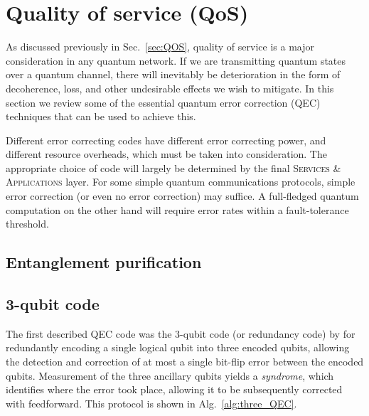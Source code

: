 %
%

\section{Quality of service (QoS)}\label{sec:QOS_chap}

As discussed previously in Sec.~\ref{sec:QOS}, quality of service is a major consideration in any quantum network. If we are transmitting quantum states over a quantum channel, there will inevitably be deterioration in the form of decoherence, loss, and other undesirable effects we wish to mitigate. In this section we review some of the essential quantum error correction (QEC) techniques that can be used to achieve this.

Different error correcting codes have different error correcting power, and different resource overheads, which must be taken into consideration. The appropriate choice of code will largely be determined by the final \textsc{Services \& Applications} layer. For some simple quantum communications protocols, simple error correction (or even no error correction) may suffice. A full-fledged quantum computation on the other hand will require error rates within a fault-tolerance threshold.

%
%

\subsection{Entanglement purification}


%
%

\subsection{3-qubit code}

The first described QEC code was the 3-qubit code (or redundancy code) by \cite{bib:Shor95} for redundantly encoding a single logical qubit into three encoded qubits, allowing the detection and correction of at most a single bit-flip error between the encoded qubits. Measurement of the three ancillary qubits yields a \textit{syndrome}, which identifies where the error took place, allowing it to be subsequently corrected with feedforward. This protocol is shown in Alg.~\ref{alg:three_QEC}.


